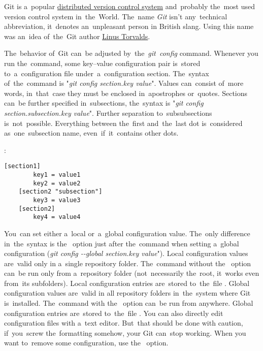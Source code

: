 \label{git}
Git is a~popular \hyperref[distributedversioncontrolsystem]{distributed version control system} and~probably the~most used version control system in~the~World. The~name \textit{Git} isn't any~technical abbreviation, it~denotes an~unpleasant person in British slang. Using this name was an~idea of~the~Git author \href{https://en.wikipedia.org/wiki/Linus_Torvalds}{Linus Torvalds}.

\label{gitconfig}
The~behavior of~Git can~be adjusted by~the~\textit{git~config} command. Whenever you run the~command, some key--value configuration pair is~stored to~a~configuration file under~a~configuration section. The~syntax of~the~command is "\textit{git config section.key value}". Values can~consist of~more words, in~that~case they must be enclosed in~apostrophes or~quotes. Sections can~be further specified in~subsections, the~syntax is "\textit{git config section.subsection.key value}". Further separation to~subsubsections is~not~possible. Everything between the~first and~the~last dot is~considered as~one~subsection name, even~if~it~contains other dots.

:
\begin{lstlisting}[frame=no]
    [section1]
        key1 = value1
        key2 = value2
    [section2 "subsection"]
        key3 = value3
    [section2]
        key4 = value4
\end{lstlisting}
\newline

\enlargethispage{-8mm}
\noindent  You~can set either a~local or~a~global configuration value. The~only difference in~the~syntax is the~ option just after the~command when setting a~global configuration (\textit{git config \mbox{-{}-global} section.key value}"). Local configuration values are~valid only in a~single repository folder. The~command without the~ option can~be run only from a~repository folder (not~necessarily the~root, it~works even from~its subfolders). Local configuration entries are~stored to~the~file . Global configuration values are~valid in all repository folders in~the~system where Git is~installed. The~command with the~ option can~be run from anywhere. Global configuration entries are~stored to~the~file . You can also directly edit configuration files with a~text editor. But~that should be done with caution, if~you~screw the~formatting somehow, your Git can~stop working. When you want to~remove some configuration, use the~ option.

